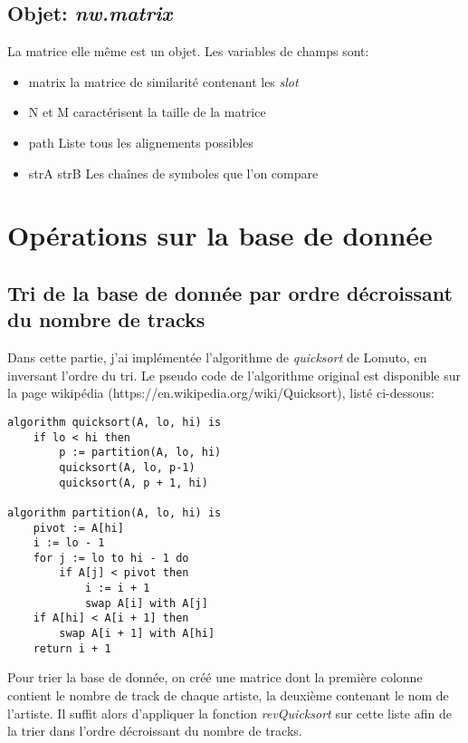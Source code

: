 \subsection{Objet: \textit{nw.matrix}}
La matrice elle même est un objet. Les variables de champs sont:
\begin{itemize}
  \item{matrix} la matrice de similarité contenant les \textit{slot}
  \item{N et M} caractérisent la taille de la matrice
  \item{path} Liste tous les alignements possibles
  \item{strA strB} Les chaînes de symboles que l'on compare
\end{itemize}

\newpage
\section{Opérations sur la base de donnée}
\subsection{Tri de la base de donnée par ordre décroissant du nombre de tracks}
Dans cette partie, j'ai implémentée l'algorithme de \textit{quicksort} de
Lomuto, en inversant l'ordre du tri. Le pseudo code de l'algorithme original 
est disponible sur la page
wikipédia (https://en.wikipedia.org/wiki/Quicksort), listé ci-dessous:

\hspace{10pt}
\begin{lstlisting}[style=customPseudo, caption=Algorithme quicksort de Lomuto]
algorithm quicksort(A, lo, hi) is
    if lo < hi then
        p := partition(A, lo, hi)
        quicksort(A, lo, p-1)
        quicksort(A, p + 1, hi)

algorithm partition(A, lo, hi) is
    pivot := A[hi]
    i := lo - 1    
    for j := lo to hi - 1 do
        if A[j] < pivot then
            i := i + 1
            swap A[i] with A[j]
    if A[hi] < A[i + 1] then
        swap A[i + 1] with A[hi]
    return i + 1
\end{lstlisting}

Pour trier la base de donnée, on créé une matrice dont la première colonne contient le
nombre de track de chaque artiste, la deuxième contenant le nom de l'artiste.
Il suffit alors d'appliquer la fonction \textit{revQuicksort} sur cette liste
afin de la trier dans l'ordre décroissant du nombre de tracks.

\newpage





